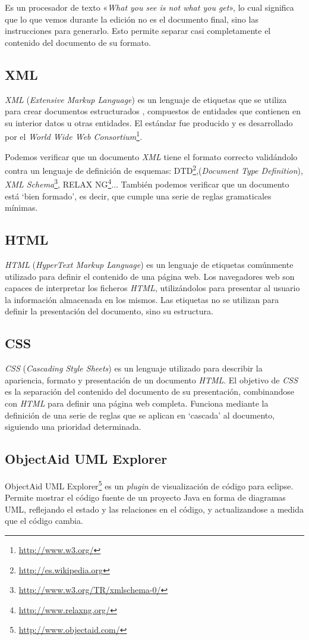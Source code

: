 Es un procesador de texto «\emph{What you see is not what you get}», lo cual significa que lo que vemos durante la edición no es el 
documento final, sino las instrucciones para generarlo.
Esto permite separar casi completamente el contenido del documento de su formato.

\subsection{XML}
\emph{XML} (\emph{Extensive Markup Language}) es un lenguaje de etiquetas que se utiliza para crear documentos estructurados \cite{website:xml}, compuestos de entidades que contienen en su interior datos u otras entidades.
El estándar fue producido y es desarrollado por el \emph{World Wide Web Consortium}\footnote{\url{http://www.w3.org/}}.

Podemos verificar que un documento \emph{XML} tiene el formato correcto validándolo contra un lenguaje de definición de esquemas: DTD\footnote{\url{http://es.wikipedia.org}},(\emph{Document Type Definition}), \emph{XML Schema}\footnote{\url{http://www.w3.org/TR/xmlschema-0/}}, RELAX NG\footnote{\url{http://www.relaxng.org/}}...
También podemos verificar que un documento está `bien formado', es decir, que cumple una serie de reglas gramaticales mínimas.

\subsection{HTML}
\emph{HTML} (\emph{HyperText Markup Language}) es un lenguaje de etiquetas comúnmente utilizado para definir el contenido de una página web.
Los navegadores web son capaces de interpretar los ficheros \emph{HTML}, utilizándolos para presentar al usuario la información almacenada en los mismos.
Las etiquetas no se utilizan para definir la presentación del documento, sino su estructura.

\subsection{CSS}
\emph{CSS} (\emph{Cascading Style Sheets}) es un lenguaje utilizado para describir la apariencia, formato y presentación de un documento \emph{HTML}.
El objetivo de \emph{CSS} es la separación del contenido del documento de su presentación, combinandose con \emph{HTML} para definir una página web completa.
Funciona mediante la definición de una serie de reglas que se aplican en `cascada' al documento, siguiendo una prioridad determinada.

\subsection{ObjectAid UML Explorer}
ObjectAid UML Explorer\footnote{\url{http://www.objectaid.com/}} es un \emph{plugin} de visualización de código para eclipse.
Permite mostrar el código fuente de un proyecto Java en forma de diagramas UML, reflejando el estado y las relaciones en el código, y actualizandose a medida que el código cambia.